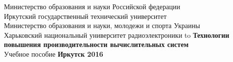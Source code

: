 \documentclass[14pt, a4paper, openany, twoside, draft]{extbook} %
\begin{document}

\renewcommand{\chaptername}{} %
\renewcommand{\refname}{Рекомендуемая литература} %
\renewcommand{\bibname}{\refname}
\begin{titlepage}
\thispagestyle{empty}
\begin{center}{\small{}
Министерство образования и науки
Российской федерации \\
Иркутский государственный технический университет\\[1ex]
Министерство образования и науки, молодежи и спорта Украины\\
Харьковский национальный университет радиоэлектроники
}
\vfill
\hbox to \linewidth{\hfill\bfseries Е.~А.~Черкашин, В.~О.~Обризан\hfill}
 \vspace{2em}
{\large\bfseries Технологии повышения производительности вычислительных систем}\\
 \vspace{2em}
{Учебное пособие}
\vfill
\vfill
 \textbf{Иркутск 2016}
\end{center}
\end{titlepage}
\end{document}
